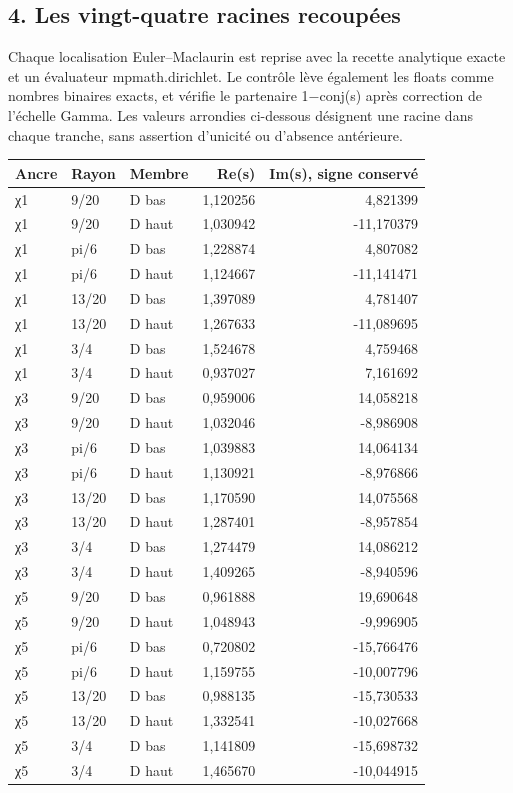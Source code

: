 \documentclass[
  10pt,
  a4paper,
]{article}
\begin{document}
\newpage

\hypertarget{les-vingt-quatre-racines-recoupuxe9es}{%
\subsection{4. Les vingt-quatre racines
recoupées}\label{les-vingt-quatre-racines-recoupuxe9es}}

Chaque localisation Euler--Maclaurin est reprise avec la recette
analytique exacte et un évaluateur mpmath.dirichlet. Le contrôle lève
également les floats comme nombres binaires exacts, et vérifie le
partenaire 1−conj(s) après correction de l'échelle Gamma. Les valeurs
arrondies ci-dessous désignent une racine dans chaque tranche, sans
assertion d'unicité ou d'absence antérieure.

\begin{longtable}[]{@{}lllrr@{}}
\toprule\noalign{}
Ancre & Rayon & Membre & Re(s) & Im(s), signe conservé \\
\midrule\noalign{}
\endhead
\bottomrule\noalign{}
\endlastfoot
χ1 & 9/20 & D bas & 1,120256 & 4,821399 \\
χ1 & 9/20 & D haut & 1,030942 & -11,170379 \\
χ1 & pi/6 & D bas & 1,228874 & 4,807082 \\
χ1 & pi/6 & D haut & 1,124667 & -11,141471 \\
χ1 & 13/20 & D bas & 1,397089 & 4,781407 \\
χ1 & 13/20 & D haut & 1,267633 & -11,089695 \\
χ1 & 3/4 & D bas & 1,524678 & 4,759468 \\
χ1 & 3/4 & D haut & 0,937027 & 7,161692 \\
χ3 & 9/20 & D bas & 0,959006 & 14,058218 \\
χ3 & 9/20 & D haut & 1,032046 & -8,986908 \\
χ3 & pi/6 & D bas & 1,039883 & 14,064134 \\
χ3 & pi/6 & D haut & 1,130921 & -8,976866 \\
χ3 & 13/20 & D bas & 1,170590 & 14,075568 \\
χ3 & 13/20 & D haut & 1,287401 & -8,957854 \\
χ3 & 3/4 & D bas & 1,274479 & 14,086212 \\
χ3 & 3/4 & D haut & 1,409265 & -8,940596 \\
χ5 & 9/20 & D bas & 0,961888 & 19,690648 \\
χ5 & 9/20 & D haut & 1,048943 & -9,996905 \\
χ5 & pi/6 & D bas & 0,720802 & -15,766476 \\
χ5 & pi/6 & D haut & 1,159755 & -10,007796 \\
χ5 & 13/20 & D bas & 0,988135 & -15,730533 \\
χ5 & 13/20 & D haut & 1,332541 & -10,027668 \\
χ5 & 3/4 & D bas & 1,141809 & -15,698732 \\
χ5 & 3/4 & D haut & 1,465670 & -10,044915 \\
\end{longtable}
\end{document}
